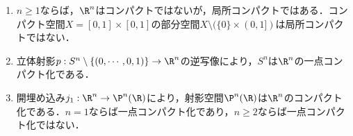 \documentclass[uplatex,dvipdfmx]{jsreport}
\begin{document}
\begin{example}\mbox{}
    \begin{enumerate}
        \item $n\ge 1$ならば，$\R^n$はコンパクトではないが，局所コンパクトではある．コンパクト空間$X=[0,1]\times [0,1]$の部分空間$X\setminus(\{0\}\times(0,1])$は局所コンパクトではない．
        \item 立体射影$p:S^n\setminus\{(0,\cdots,0,1)\}\to\R^n$の逆写像により，$S^n$は$\R^n$の一点コンパクト化である．
        \item 開埋め込み$j_1:\R^n\to\P^n(\R)$により，射影空間$\P^n(\R)$は$\R^n$のコンパクト化である．$n=1$ならば一点コンパクト化であり，$n\ge 2$ならば一点コンパクト化ではない．
    \end{enumerate}
\end{example}
\end{document}
